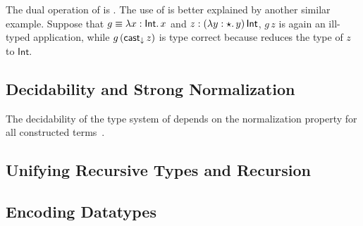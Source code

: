 The dual operation of \castup is \castdn. The use of \castdn is better explained by another similar example. Suppose that $ g \equiv \lambda x:\mathsf{Int}.\,x $ and $ z : (\lambda y:\star.\,y)\,\mathsf{Int} $, $ g\,z $ is again an ill-typed application, while $ g\,(\mathsf{cast}_\downarrow\,z) $ is type correct because \castdn reduces the type of $ z $ to $ \mathsf{Int} $.

\subsection{Decidability and Strong Normalization}


The decidability of the type system of \coc depends on the normalization property for all constructed terms~\cite{coc:decidability}.

\subsection{Unifying Recursive Types and Recursion}


\subsection{Encoding Datatypes}


